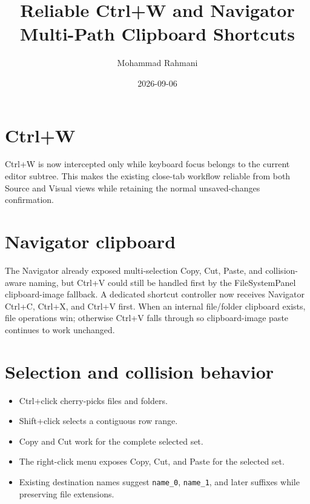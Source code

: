 \documentclass[a4paper]{article}
\title{Reliable Ctrl+W and Navigator Multi-Path Clipboard Shortcuts}
\date{2026-09-06}
\author{Mohammad Rahmani}
\begin{document}
   \maketitle

   \section{Ctrl+W}
   Ctrl+W is now intercepted only while keyboard focus belongs to the current
   editor subtree. This makes the existing close-tab workflow reliable from
   both Source and Visual views while retaining the normal unsaved-changes
   confirmation.

   \section{Navigator clipboard}
   The Navigator already exposed multi-selection Copy, Cut, Paste, and
   collision-aware naming, but Ctrl+V could still be handled first by the
   FileSystemPanel clipboard-image fallback. A dedicated shortcut controller
   now receives Navigator Ctrl+C, Ctrl+X, and Ctrl+V first. When an internal
   file/folder clipboard exists, file operations win; otherwise Ctrl+V falls
   through so clipboard-image paste continues to work unchanged.

   \section{Selection and collision behavior}
   \begin{itemize}
      \item Ctrl+click cherry-picks files and folders.
      \item Shift+click selects a contiguous row range.
      \item Copy and Cut work for the complete selected set.
      \item The right-click menu exposes Copy, Cut, and Paste for the selected set.
      \item Existing destination names suggest \texttt{name\_0},
      \texttt{name\_1}, and later suffixes while preserving file extensions.
   \end{itemize}

   
   
\end{document}
